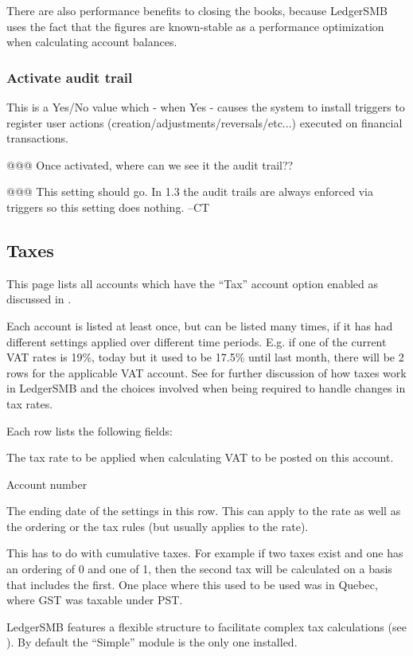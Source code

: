 There are also performance benefits to closing the books, because LedgerSMB uses the
fact that the figures are known-stable as a performance optimization when calculating
account balances.

\subsubsection{Activate audit trail}
\label{subsubsec-company-config-audit-control-audit-trail}

This is a Yes/No value which - when Yes - causes the system to install triggers to register
user actions (creation/adjustments/reversals/etc...) executed on financial transactions.


@@@ Once activated, where can we see it the audit trail??

@@@ This setting should go.  In 1.3 the audit trails are always enforced via
triggers so this setting does nothing.  --CT

\subsection{Taxes}
\label{subsec-company-config-taxes}


This page lists all accounts which have the ``Tax'' account option enabled as discussed in .

Each account is listed at least once, but can be listed many times, if it has had different
settings applied over different time periods. E.g. if one of the current VAT rates is 19\%,
today but it used to be 17.5\% until last month, there will be 2 rows for the applicable
VAT account. See  for further discussion of how taxes work in
LedgerSMB and the choices involved when being required to handle changes in tax rates.

Each row lists the following fields:

\begin{description}[style=nextline]
\item [Rate (\%)] The tax rate to be applied when calculating VAT to be posted on this account.
\item [Number] Account number
\item [Valid To] The ending date of the settings in this row. This can apply to the rate as well as the ordering or the tax rules (but usually applies to the rate).
\item [Ordering] This has to do with cumulative taxes.  For example if two taxes
exist and one has an ordering of 0 and one of 1, then the second tax will be
calculated on a basis that includes the first.  One place where this used to be
used was in Quebec, where GST was taxable under PST.
\item [Tax rules] LedgerSMB features a flexible structure to facilitate complex tax
calculations (see ). By default the ``Simple'' module
is the only one installed.
\end{description}

